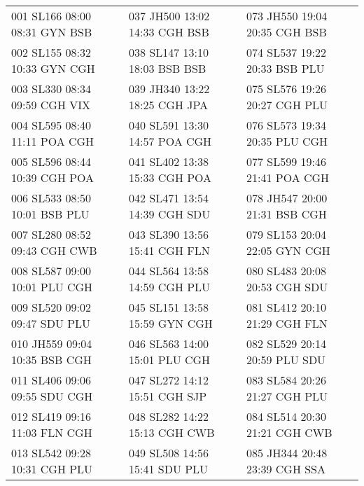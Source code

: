 \documentclass{endm}
\begin{document}
\begin{center}


\renewcommand{\arraystretch}{0.6}

\label {tabela1}
\begin{longtable}{lll} 


  \scriptsize001 SL166 08:00 08:31 GYN BSB  & \scriptsize  037 JH500 13:02 14:33 CGH BSB & \scriptsize 073 JH550 19:04 20:35 CGH BSB\\
  \scriptsize002 SL155 08:32 10:33 GYN CGH  &  \scriptsize  038 SL147 13:10 18:03 BSB BSB   & \scriptsize074 SL537 19:22 20:33 BSB PLU\\
  \scriptsize003 SL330 08:34 09:59 CGH VIX    &  \scriptsize  039 JH340 13:22 18:25 CGH JPA   &  \scriptsize 075 SL576 19:26 20:27 CGH PLU \\
  \scriptsize004 SL595 08:40 11:11 POA CGH    &  \scriptsize  040 SL591 13:30 14:57 POA CGH &  \scriptsize076 SL573 19:34 20:35 PLU CGH  \\
  \scriptsize005 SL596 08:44 10:39 CGH POA  &  \scriptsize  041 SL402 13:38 15:33 CGH POA     &  \scriptsize 077 SL599 19:46 21:41 POA CGH  \\
  \scriptsize006 SL533 08:50 10:01 BSB PLU   &   \scriptsize  042 SL471 13:54 14:39 CGH SDU  & \scriptsize 078 JH547 20:00 21:31 BSB CGH\\
  \scriptsize007 SL280 08:52 09:43 CGH CWB  &  \scriptsize  043 SL390 13:56 15:41 CGH FLN   &  \scriptsize  079 SL153 20:04 22:05 GYN CGH\\
  \scriptsize008 SL587 09:00 10:01 PLU CGH    &  \scriptsize  044 SL564 13:58 14:59 CGH PLU  &  \scriptsize   080 SL483 20:08 20:53 CGH SDU \\
  \scriptsize009 SL520 09:02 09:47 SDU PLU   & \scriptsize  045 SL151 13:58 15:59 GYN CGH   &  \scriptsize   081 SL412 20:10 21:29 CGH FLN \\
  \scriptsize010 JH559 09:04 10:35 BSB CGH   &  \scriptsize  046 SL563 14:00 15:01 PLU CGH    & \scriptsize  082 SL529 20:14 20:59 PLU SDU \\
  \scriptsize011 SL406 09:06 09:55 SDU CGH &    \scriptsize 047 SL272 14:12 15:51 CGH SJP   &    \scriptsize 083 SL584 20:26 21:27 CGH PLU\\
  \scriptsize012 SL419 09:16 11:03 FLN CGH   &  \scriptsize  048 SL282 14:22 15:13 CGH CWB  &  \scriptsize  084 SL514 20:30 21:21 CGH CWB \\
  \scriptsize013 SL542 09:28 10:31 CGH PLU    &  \scriptsize  049 SL508 14:56 15:41 SDU PLU   &  \scriptsize   085 JH344 20:48 23:39 CGH SSA \\

\end{longtable}
\end{center}
\end{document}
